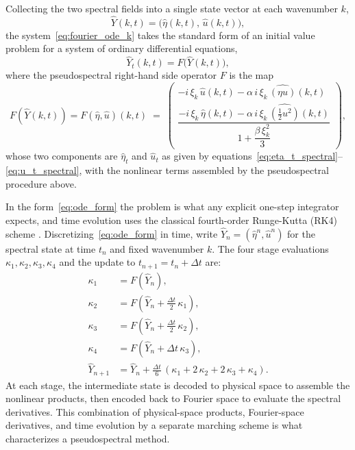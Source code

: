 Collecting the two spectral fields into a single state vector at each wavenumber $k$,
\begin{equation*}
    \hat{Y}(k,t) = \bigl(\hat{\eta}(k,t),\, \hat{u}(k,t)\bigr),
\end{equation*}
the system~\eqref{eq:fourier_ode_k} takes the standard form of an initial value problem for a system of ordinary differential equations,
\begin{equation}\label{eq:ode_form}
    \hat{Y}_t(k, t) = F\bigl(\hat{Y}(k,t)\bigr),
\end{equation}
where the pseudospectral right-hand side operator $F$ is the map
\begin{equation*}
    F\!\left(\hat{Y}(k, t)\right) = F\!\left(\hat{\eta},\hat{u}\right)(k,t)
    \;=\;
    \begin{pmatrix}
        -i\,\xi_k\,\hat{u}(k, t)
        - \alpha\,i\,\xi_k\,\widehat{(\eta u)}(k, t) \\[6pt]
        \dfrac{
            -i\,\xi_k\,\hat{\eta}(k, t)
            - \alpha\,i\,\xi_k\,\widehat{\!\left(\tfrac{1}{2}u^2\right)}\!(k, t)
        }{
            1 + \dfrac{\beta\,\xi_k^2}{3}
        }
    \end{pmatrix},
\end{equation*}
whose two components are $\hat{\eta}_t$ and $\hat{u}_t$ as given by equations~\eqref{eq:eta_t_spectral}--\eqref{eq:u_t_spectral}, with the nonlinear terms assembled by the pseudospectral procedure above.

In the form~\eqref{eq:ode_form} the problem is what any explicit one-step integrator expects, and time evolution uses the classical fourth-order Runge-Kutta (RK4) scheme \parencite{suli2003, burden2011}. Discretizing~\eqref{eq:ode_form} in time, write $\hat{Y}_n = (\hat{\eta}^n, \hat{u}^n)$ for the spectral state at time $t_n$ and fixed wavenumber $k$. The four stage evaluations $\kappa_1, \kappa_2, \kappa_3, \kappa_4$ and the update to $t_{n+1} = t_n + \Delta t$ are:
\begin{align*}
    \kappa_1 &= F(\hat{Y}_n), \\
    \kappa_2 &= F\!\left(\hat{Y}_n + \tfrac{\Delta t}{2}\, \kappa_1\right), \\
    \kappa_3 &= F\!\left(\hat{Y}_n + \tfrac{\Delta t}{2}\, \kappa_2\right), \\
    \kappa_4 &= F\!\left(\hat{Y}_n + \Delta t\, \kappa_3\right), \\
    \hat{Y}_{n+1}  &= \hat{Y}_n + \frac{\Delta t}{6}\,(\kappa_1 + 2\,\kappa_2 + 2\,\kappa_3 + \kappa_4).
\end{align*}
At each stage, the intermediate state is decoded to physical space to assemble the nonlinear products, then encoded back to Fourier space to evaluate the spectral derivatives. This combination of physical-space products, Fourier-space derivatives, and time evolution by a separate marching scheme is what characterizes a pseudospectral method.

